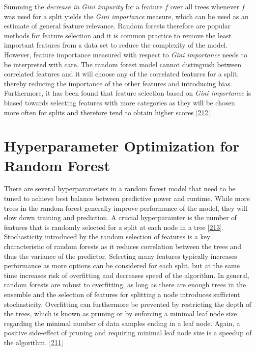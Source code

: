\documentclass[11pt,a4paper,twoside]{book}
\theoremstyle{definition}
\theoremstyle{definition}
\theoremstyle{remark}
\begin{document}
Summing the \emph{decrease in Gini impurity} for a feature \(f\) over
all trees whenever \(f\) was used for a split yields the \emph{Gini
importance} measure, which can be used as an estimate of general feature
relevance. Random forests therefore are popular methods for feature
selection and it is common practice to remove the least important
features from a data set to reduce the complexity of the model. However,
feature importance measured with respect to \emph{Gini importance} needs
to be interpreted with care. The random forest model cannot distinguish
between correlated features and it will choose any of the correlated
features for a split, thereby reducing the importance of the other
features and introducing bias. Furthermore, it has been found that
feature selection based on \emph{Gini importance} is biased towards
selecting features with more categories as they will be chosen more
often for splits and therefore tend to obtain higher scores
{[}\protect\hyperlink{ref-Strobl2007}{212}{]}.

\section{Hyperparameter Optimization for Random
Forest}\label{hyperparameter-optimization-for-random-forest}

There are several hyperparameters in a random forest model that need to
be tuned to achieve best balance between predictive power and runtime.
While more trees in the random forest generally improve performance of
the model, they will slow down training and prediction. A crucial
hyperparamter is the number of features that is randomly selected for a
split at each node in a tree
{[}\protect\hyperlink{ref-Bernard2009}{213}{]}. Stochasticity introduced
by the random selection of features is a key characteristic of random
forests as it reduces correlation between the trees and thus the
variance of the predictor. Selecting many features typically increases
performance as more options can be considered for each split, but at the
same time increases risk of overfitting and decreases speed of the
algorithm. In general, random forests are robust to overfitting, as long
as there are enough trees in the ensemble and the selection of features
for splitting a node introduces sufficient stochasticity. Overfitting
can furthermore be prevented by restricting the depth of the trees,
which is known as pruning or by enforcing a minimal leaf node size
regarding the minimal number of data samples ending in a leaf node.
Again, a positive side-effect of pruning and requiring minimal leaf node
size is a speedup of the algorithm.
{[}\protect\hyperlink{ref-Louppe2014}{211}{]}
\end{document}
